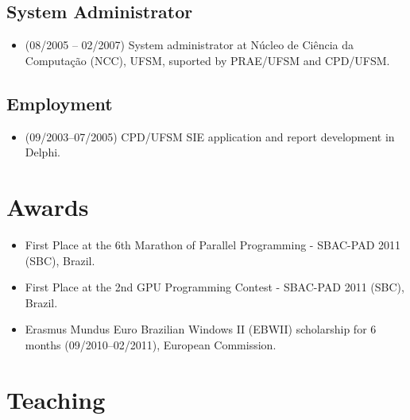 \documentclass[11pt,a4paper]{article}
\begin{document}
\subsection{System Administrator} 

\begin{itemize}  \itemsep -2pt %
\item (08/2005 -- 02/2007) System administrator at Núcleo de Ciência da
Computação (NCC), UFSM, suported by PRAE/UFSM and CPD/UFSM.
\end{itemize}

\subsection{Employment}

\begin{itemize}  \itemsep -2pt %
\item (09/2003--07/2005) CPD/UFSM SIE application and report development in Delphi.
\end{itemize}

\section{Awards}

\begin{itemize} \itemsep -2pt
\item First Place at the 6th Marathon of Parallel Programming - SBAC-PAD 2011 (SBC), Brazil. 
\item First Place at the 2nd GPU Programming Contest - SBAC-PAD 2011 (SBC), Brazil. 
\item Erasmus Mundus Euro Brazilian Windows II (EBWII) scholarship for 6 months
(09/2010--02/2011), European Commission.
\end{itemize}

\section{Teaching}
\end{document}
